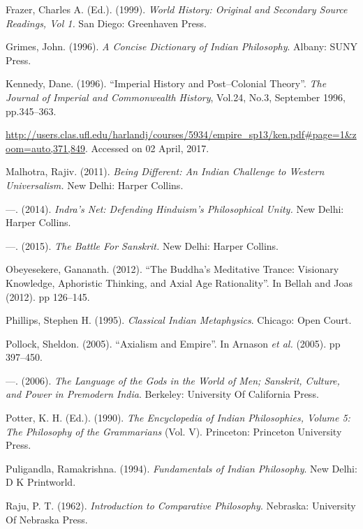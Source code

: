 \begin{thebibliography}{99}
  Frazer, Charles A. (Ed.). (1999). \textit{World History: Original and Secondary Source Readings, Vol 1.} San Diego: Greenhaven Press.

  Grimes, John. (1996). \textit{A Concise Dictionary of Indian Philosophy}. Albany: SUNY Press.

  Kennedy, Dane. (1996). “Imperial History and Post–Colonial Theory”. \textit{The Journal of Imperial and Commonwealth History}, Vol.24, No.3, September 1996, pp.345–363.

  \url{http://users.clas.ufl.edu/harlandj/courses/5934/empire_sp13/ken.pdf#page=1&zoom=auto,371,849}. Accessed on 02 April, 2017.

  Malhotra, Rajiv. (2011). \textit{Being Different: An Indian Challenge to Western Universalism.} New Delhi: Harper Collins.

  —. (2014).\textit{ Indra's Net: Defending Hinduism's Philosophical Unity.} New Delhi: Harper Collins.

  —. (2015). \textit{The Battle For Sanskrit.} New Delhi: Harper Collins.

  Obeyesekere, Gananath. (2012). “The Buddha’s Meditative Trance: Visionary Knowledge, Aphoristic Thinking, and Axial Age Rationality”. In Bellah and Joas (2012). pp 126–145.

  Phillips, Stephen H. (1995). \textit{Classical Indian Metaphysics}. Chicago: Open Court.

  Pollock, Sheldon. (2005). “Axialism and Empire”. In Arnason \textit{et al.} (2005). pp 397–450.

  —. (2006). \textit{The Language of the Gods in the World of Men; Sanskrit, Culture, and Power in Premodern India}. Berkeley: University Of California Press.

  Potter, K. H. (Ed.). (1990). \textit{The Encyclopedia of Indian Philosophies, Volume 5: The Philosophy of the Grammarians} (Vol. V). Princeton: Princeton University Press.

  Puligandla, Ramakrishna. (1994). \textit{Fundamentals of Indian Philosophy}. New Delhi: D K Printworld.

  Raju, P. T. (1962). \textit{Introduction to Comparative Philosophy}. Nebraska: University Of Nebraska Press.


\end{thebibliography}
